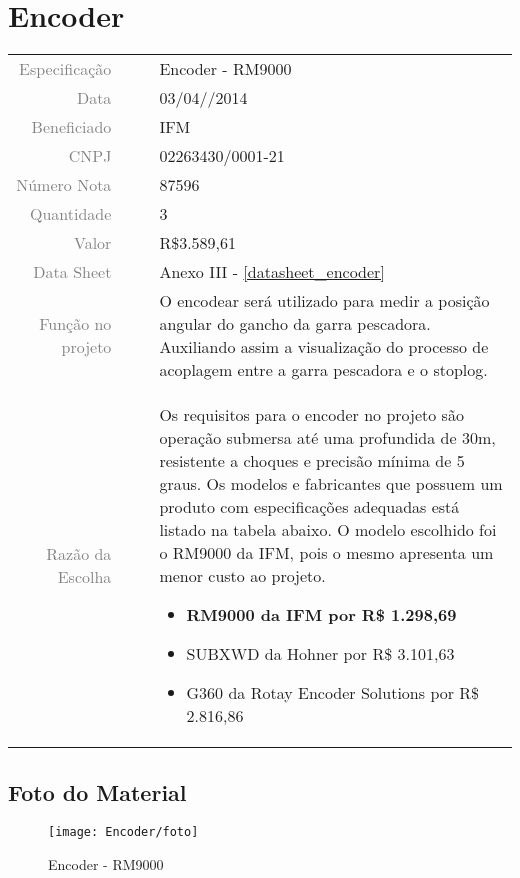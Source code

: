 

\section{Encoder}
\label{encoder}

 
\begin{table}[ht!]

	\begin{tabular}{r l|l p{12cm} }
		
		\textcolor{gray}{Especificação} &&& 	{Encoder - RM9000 }\\
		\textcolor{gray}{Data} &&& 				{03/04//2014}\\
        \textcolor{gray}{Beneficiado} &&&		{IFM} \\
        \textcolor{gray}{CNPJ} &&& 				{02263430/0001-21} \\
        \textcolor{gray}{Número Nota} &&& 		{87596} \\
		\textcolor{gray}{Quantidade} &&& 		{3} \\
		\textcolor{gray}{Valor} &&& 			{R\$3.589,61} \\
		\textcolor{gray}{Data Sheet} &&& 		{Anexo III - \ref{datasheet_encoder} } \\

		\textcolor{gray}{Função no projeto} &&& {O encodear será utilizado para medir a posição angular do gancho da garra pescadora. Auxiliando assim a visualização do processo de acoplagem entre a garra pescadora e o stoplog.   } \\
		\textcolor{gray}{Razão da Escolha} &&& {Os requisitos para o encoder no projeto são operação submersa até uma profundida de 30m, resistente a choques e precisão mínima de 5 graus.  Os modelos e fabricantes que possuem um produto com especificações adequadas está listado na tabela abaixo. O modelo escolhido foi o RM9000 da IFM, pois o mesmo apresenta um menor custo ao projeto. 
		\begin{itemize}
		  \item \textbf{RM9000 da IFM por R\$ 1.298,69} 
		  \item SUBXWD da Hohner por R\$ 3.101,63
		  \item G360 da Rotay Encoder Solutions por R\$ 2.816,86
		\end{itemize}}
		

	\end{tabular}
\end{table}

\newpage
\subsection{Foto do Material}
\begin{figure}[H]
 \centering
 \texttt{[image: Encoder/foto]}
 \caption{Encoder - RM9000 }
  
\end{figure}
\newpage
